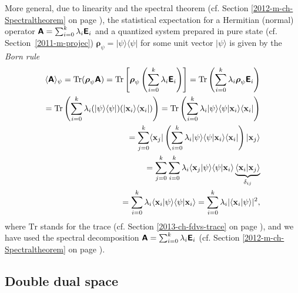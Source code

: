 {More general,  due to linearity and the spectral theorem
(cf. Section \ref{2012-m-ch-Spectraltheorem} on page \pageref{2012-m-ch-Spectraltheorem}),
the statistical expectation for a Hermitian (normal) operator $\textsf{\textbf{A}}=
\sum_{i=0}^k   \lambda_i \textsf{\textbf{E}}_i$
and a quantized system prepared in pure state
(cf. Section~\ref{2011-m-projec})
$\boldsymbol{\rho}_\psi = \vert {\psi}\rangle \langle \psi \vert$ for some unit vector $\vert {\psi}\rangle$
is given by the {\em Born rule}
\begin{equation}
\begin{split}
\langle \textsf{\textbf{A}}\rangle_{\psi} = \text{Tr} (\boldsymbol{\rho}_\psi \textsf{\textbf{A}})
=
\text{Tr}  \left[\boldsymbol{\rho}_\psi  \left(\sum_{i=0}^k   \lambda_i  \textsf{\textbf{E}}_i  \right)\right] =
\text{Tr}  \left(\sum_{i=0}^k   \lambda_i \boldsymbol{\rho}_\psi  \textsf{\textbf{E}}_i  \right)\\
=
 \text{Tr} \left(\sum_{i=0}^k   \lambda_i (\vert \psi \rangle \langle \psi \vert )( \vert {\bf x}_i \rangle \langle {\bf x}_i \vert )\right)
=
 \text{Tr} \left(\sum_{i=0}^k   \lambda_i  \vert \psi \rangle \langle \psi \vert   {\bf x}_i \rangle \langle {\bf x}_i \vert  \right)\\
=
\sum_{j=0}^k \langle {\bf x}_j \vert
\left(  \sum_{i=0}^k   \lambda_i  \vert \psi \rangle  \langle \psi   \vert {\bf x}_i \rangle   \langle {\bf x}_i \vert \right)   \vert{\bf x}_j \rangle    \\
=
\sum_{j=0}^k
   \sum_{i=0}^k   \lambda_i  \langle {\bf x}_j \vert \psi \rangle   \langle \psi   \vert {\bf x}_i \rangle
\underbrace{ \langle {\bf x}_i \vert    {\bf x}_j \rangle }_{\delta_{ij}}  \\
=
\sum_{i=0}^k   \lambda_i  \langle {\bf x}_i \vert \psi \rangle \langle \psi   \vert {\bf x}_i \rangle
=
\sum_{i=0}^k   \lambda_i \vert \langle {\bf x}_i \vert \psi \rangle \vert^2,
\end{split}
\label{2015-m-ch-fdlvs-bornr}
\end{equation}
where $\text{Tr}$ stands for the trace (cf. Section \ref{2013-ch-fdvs-trace} on page \pageref{2013-ch-fdvs-trace}),
and we have used the spectral decomposition $\textsf{\textbf{A}}= \sum_{i=0}^k   \lambda_i \textsf{\textbf{E}}_i$
(cf. Section \ref{2012-m-ch-Spectraltheorem} on page \pageref{2012-m-ch-Spectraltheorem}).
}


\subsection{Double dual space}
\label{2012-m-dds}

